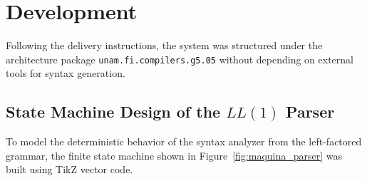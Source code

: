 \documentclass[letterpaper,12pt,oneside]{article}
\begin{document}
\section{Development}

Following the delivery instructions, the system was structured under the architecture package \texttt{unam.fi.compilers.g5.05} without depending on external tools for syntax generation.

\subsection{State Machine Design of the $LL(1)$ Parser}
To model the deterministic behavior of the syntax analyzer from the left-factored grammar, the finite state machine shown in Figure~\ref{fig:maquina_parser} was built using TikZ vector code.
\end{document}
